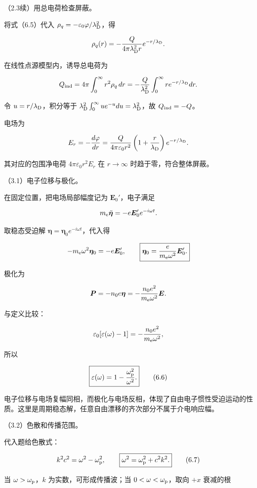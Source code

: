 \documentclass[12pt,a4paper,fontset=fandol]{ctexart}
\begin{document}
（2.3续）用总电荷检查屏蔽。

将式（6.5）代入 \(\rho_q=-\varepsilon_0\varphi/\lambda_{\rm D}^2\)，得

\[
\rho_q(r)=-\frac{Q}{4\pi\lambda_{\rm D}^2r}e^{-r/\lambda_{\rm D}}.
\]

在线性点源模型内，诱导总电荷为

\[
Q_{\rm ind}=4\pi\int_0^\infty r^2\rho_q\,dr
=-\frac{Q}{\lambda_{\rm D}^2}\int_0^\infty re^{-r/\lambda_{\rm D}}dr.
\]

令 \(u=r/\lambda_{\rm D}\)，积分等于
\(\lambda_{\rm D}^2\int_0^\infty ue^{-u}du=\lambda_{\rm D}^2\)，故
\(Q_{\rm ind}=-Q\)。

电场为

\[
E_r=-\frac{d\varphi}{dr}
=\frac{Q}{4\pi\varepsilon_0r^2}
\left(1+\frac r{\lambda_{\rm D}}\right)e^{-r/\lambda_{\rm D}}.
\]

其对应的包围净电荷 \(4\pi\varepsilon_0r^2E_r\) 在 \(r\to\infty\)
时趋于零，符合整体屏蔽。

（3.1）电子位移与极化。

在固定位置，把电场局部幅度记为 \(\boldsymbol E_0'\)，电子满足

\[
m_{\rm e}\ddot{\boldsymbol\eta}=-e\boldsymbol E_0'e^{-i\omega t}.
\]

取稳态受迫解 \(\boldsymbol\eta=\boldsymbol\eta_0e^{-i\omega t}\)，代入得

\[
-m_{\rm e}\omega^2\boldsymbol\eta_0=-e\boldsymbol E_0',
\qquad
\boxed{\boldsymbol\eta_0=\frac{e}{m_{\rm e}\omega^2}\boldsymbol E_0'.}
\]

极化为

\[
\boldsymbol P=-n_0e\boldsymbol\eta
=-\frac{n_0e^2}{m_{\rm e}\omega^2}\boldsymbol E.
\]

与定义比较：

\[
\varepsilon_0[\varepsilon(\omega)-1]
=-\frac{n_0e^2}{m_{\rm e}\omega^2},
\]

所以

\[
\boxed{\varepsilon(\omega)=1-\frac{\omega_{\rm p}^2}{\omega^2}.}
\tag{6.6}
\]

电子位移与电场复幅同相，而极化与电场反相，体现了自由电子惯性受迫运动的性质。这里是周期稳态解，任意自由漂移的齐次部分不属于介电响应幅。

（3.2）色散和传播范围。

代入题给色散式：

\[
k^2c^2=\omega^2-\omega_{\rm p}^2,
\qquad
\boxed{\omega^2=\omega_{\rm p}^2+c^2k^2.}
\tag{6.7}
\]

当 \(\omega>\omega_{\rm p}\)，\(k\) 为实数，可形成传播波；当
\(0<\omega<\omega_{\rm p}\)，取向 \(+x\) 衰减的根
\end{document}
